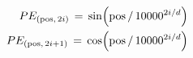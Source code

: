 \documentclass[preview]{standalone}
\begin{document}
\begin{align*}
\special{dvisvgm:raw <g id='unique000'>}PE_{(\text{pos},\, 2i)}   \,=\, \sin\!\left(\text{pos} \,/\, 10000^{2i/d}\right) \special{dvisvgm:raw </g>}\special{dvisvgm:raw <g id='unique001'>}\\ \special{dvisvgm:raw </g>}\special{dvisvgm:raw <g id='unique002'>}PE_{(\text{pos},\, 2i+1)} \,=\, \cos\!\left(\text{pos} \,/\, 10000^{2i/d}\right)\special{dvisvgm:raw </g>}
\end{align*}
\end{document}
